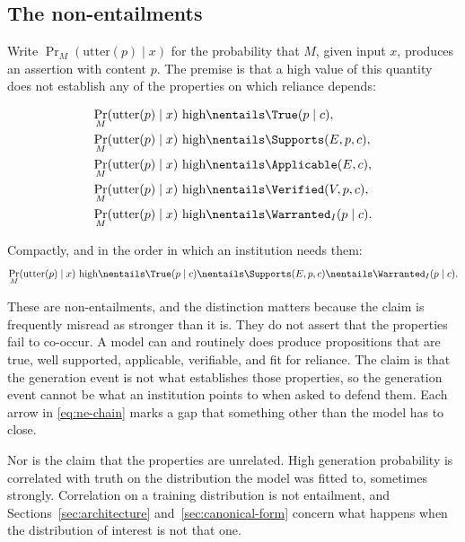 \subsection{The non-entailments}

Write $\Pr_M(\mathrm{utter}(p) \mid x)$ for the probability that $M$, given input
$x$, produces an assertion with content $p$. The premise is that a high value of
this quantity does not establish any of the properties on which reliance depends:

\begin{align}
  \Pr_M(\mathrm{utter}(p) \mid x) \text{ high}
    &\nentails \True(p \mid c),            \label{eq:ne-true}\\
  \Pr_M(\mathrm{utter}(p) \mid x) \text{ high}
    &\nentails \Supports(E, p, c),         \label{eq:ne-supported}\\
  \Pr_M(\mathrm{utter}(p) \mid x) \text{ high}
    &\nentails \Applicable(E, c),          \label{eq:ne-applicable}\\
  \Pr_M(\mathrm{utter}(p) \mid x) \text{ high}
    &\nentails \Verified(V, p, c),         \label{eq:ne-verified}\\
  \Pr_M(\mathrm{utter}(p) \mid x) \text{ high}
    &\nentails \Warranted_I(p \mid c).     \label{eq:ne-warranted}
\end{align}

Compactly, and in the order in which an institution needs them:
\begin{equation}
  \Pr_M(\mathrm{utter}(p) \mid x) \text{ high}
  \nentails \True(p \mid c)
  \nentails \Supports(E, p, c)
  \nentails \Warranted_I(p \mid c).
  \label{eq:ne-chain}
\end{equation}

These are non-entailments, and the distinction matters because the claim is
frequently misread as stronger than it is. They do not assert that the properties
fail to co-occur. A model can and routinely does produce propositions that are
true, well supported, applicable, verifiable, and fit for reliance. The claim is
that the generation event is not what establishes those properties, so the
generation event cannot be what an institution points to when asked to defend
them. Each arrow in \eqref{eq:ne-chain} marks a gap that something other than the
model has to close.

Nor is the claim that the properties are unrelated. High generation probability is
correlated with truth on the distribution the model was fitted to, sometimes
strongly. Correlation on a training distribution is not entailment, and
Sections~\ref{sec:architecture} and~\ref{sec:canonical-form} concern what happens
when the distribution of interest is not that one.

